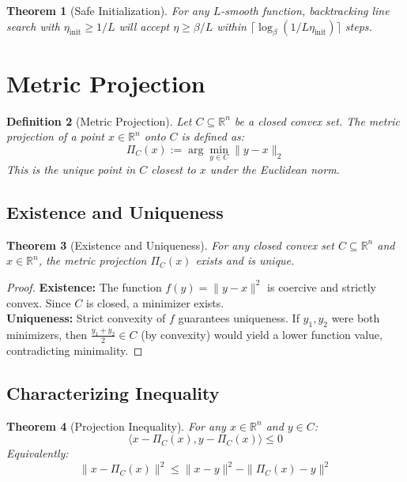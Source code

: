 \documentclass{article}
\newtheorem{theorem}{Theorem}
\newtheorem{definition}[theorem]{Definition}
\begin{document}
\begin{theorem}[Safe Initialization]
For any \( L \)-smooth function, backtracking line search with \( \eta_{\text{init}} \geq 1/L \) will accept \( \eta \geq \beta/L \) within \( \lceil \log_\beta(1/L\eta_{\text{init}}) \rceil \) steps.
\end{theorem}


\section{Metric Projection}
\begin{definition}[Metric Projection]
Let \( C \subseteq \mathbb{R}^n \) be a closed convex set. The metric projection of a point \( x \in \mathbb{R}^n \) onto \( C \) is defined as:
\[
\Pi_C(x) := \arg\min_{y \in C} \|y - x\|_2
\]
This is the unique point in \( C \) closest to \( x \) under the Euclidean norm.
\end{definition}

\subsection{Existence and Uniqueness}
\begin{theorem}[Existence and Uniqueness]
For any closed convex set \( C \subseteq \mathbb{R}^n \) and \( x \in \mathbb{R}^n \), the metric projection \( \Pi_C(x) \) exists and is unique.
\end{theorem}

\begin{proof}
\textbf{Existence:} The function \( f(y) = \|y - x\|^2 \) is coercive and strictly convex. Since \( C \) is closed, a minimizer exists. \\
\textbf{Uniqueness:} Strict convexity of \( f \) guarantees uniqueness. If \( y_1, y_2 \) were both minimizers, then \( \frac{y_1 + y_2}{2} \in C \) (by convexity) would yield a lower function value, contradicting minimality.
\end{proof}

\subsection{Characterizing Inequality}
\begin{theorem}[Projection Inequality]
For any \( x \in \mathbb{R}^n \) and \( y \in C \):
\[
\langle x - \Pi_C(x), y - \Pi_C(x) \rangle \leq 0
\]
Equivalently:
\[
\|x - \Pi_C(x)\|^2 \leq \|x - y\|^2 - \|\Pi_C(x) - y\|^2
\]
\end{theorem}
\end{document}

